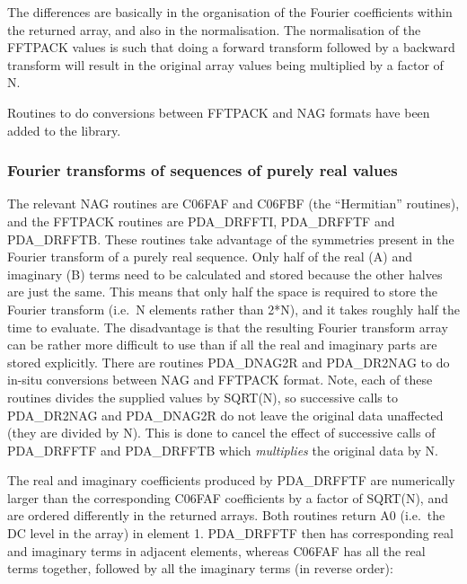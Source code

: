 \documentclass[11pt,twoside]{article}
\newcommand{\htmlref}[2]{#1}
\newcommand{\xlabel}[1]{}
\begin{document}
   The differences are basically in the organisation of the Fourier
   coefficients within the returned array, and also in the
   normalisation. The normalisation of the FFTPACK values is such that
   doing a forward transform followed by a backward transform will
   result in the original array values being multiplied by a factor of
   N.

   Routines to do conversions between FFTPACK and NAG formats have been
   added to the library.


\subsubsection{\xlabel{fourier_transforms_of_sequences_of_purely_real_values}Fourier transforms of sequences of purely real values}

   The relevant NAG routines are C06FAF and C06FBF (the ``Hermitian''
   routines), and the FFTPACK routines are PDA\_DRFFTI, PDA\_DRFFTF and
   PDA\_DRFFTB.
   These routines take advantage of the symmetries present in the Fourier
   transform of a purely real sequence. Only half of the real (A) and
   imaginary (B) terms need to be calculated and stored because the
   other halves are just the same. This means that only half the space
   is required to store the Fourier transform (i.e.\ N elements rather
   than 2*N), and it takes roughly half the time to evaluate. The
   disadvantage is that the resulting Fourier transform array can be
   rather more difficult to use than if all the real and imaginary parts
   are stored explicitly. There are routines
\htmlref{PDA\_DNAG2R}{PDA\_NAG2R} and
\htmlref{PDA\_DR2NAG}{PDA\_R2NAG}
   to do in-situ conversions between NAG and FFTPACK format. Note, each
   of these routines divides the supplied values by SQRT(N), so
   successive calls to PDA\_DR2NAG and PDA\_DNAG2R do not leave the
   original data
   unaffected (they are divided by N). This is done to cancel the effect
   of successive calls of PDA\_DRFFTF and PDA\_DRFFTB which {\em
   multiplies\/} the original data by N.

   The real and imaginary coefficients produced by PDA\_DRFFTF are
   numerically larger than the corresponding C06FAF coefficients by a
   factor of SQRT(N), and are ordered differently in the returned
   arrays. Both routines return A0 (i.e.\ the DC level in the array) in
   element 1. PDA\_DRFFTF then has corresponding real and imaginary terms in
   adjacent elements, whereas C06FAF has all the real terms together,
   followed by all the imaginary terms (in reverse order):
\end{document}

